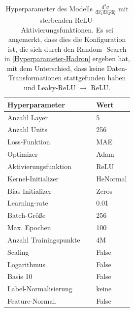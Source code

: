 \begin{table}[hbt]
	\centering
	\begin{tabular}{ll}
		Hyperparameter & Wert \\
		\hline \hline
		Anzahl Layer & 5 \\
		Anzahl Units & 256 \\
		Loss-Funktion & MAE \\
		Optimizer & Adam \\
		Aktivierungsfunktion & ReLU \\
		Kernel-Initializer & HeNormal \\
		Bias-Initializer & Zeros \\
		Learning-rate & 0.01 \\
		Batch-Größe & 256 \\
		Max. Epochen & 100 \\
		Anzahl Trainingspunkte $\quad$& 4M\\
		Scaling & False \\
		Logarithmus & False \\
		Basis 10 & False \\
		Label-Normalisierung & keine \\
		Feature-Normal. & False \\
	\end{tabular}
	\caption{Hyperparameter des Modells $\frac{\text{d}^3\sigma}{\text{d}x_1 \text{d}x_2\text{d}\eta}$ mit sterbenden ReLU- Aktivierungsfunktionen. Es sei angemerkt, dass dies die Konfiguration ist, die sich durch den Random- Search in \textsf{\autoref{Hyperparameter-Hadron}} ergeben hat, mit dem Unterschied, dass keine Daten- Transformationen stattgefunden haben und Leaky-ReLU $\rightarrow$ ReLU.}
	\label{Hyperparameter-Eta}
\end{table}